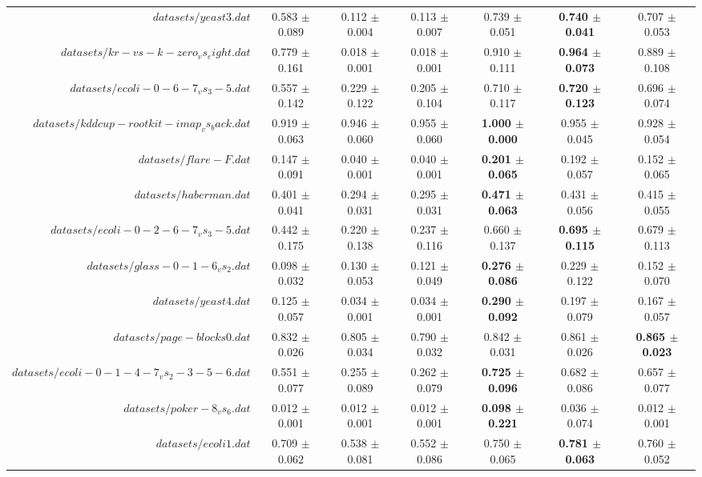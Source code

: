 \begin{table}[!ht]
{\begin{tabular}{r c c c c c c}
$datasets/yeast3.dat$ & 0.583 $\pm$ 0.089 & 0.112 $\pm$ 0.004 & 0.113 $\pm$ 0.007 & 0.739 $\pm$ 0.051 & \textbf{0.740 $\pm$ 0.041} & 0.707 $\pm$ 0.053 \\
$datasets/kr-vs-k-zero_vs_eight.dat$ & 0.779 $\pm$ 0.161 & 0.018 $\pm$ 0.001 & 0.018 $\pm$ 0.001 & 0.910 $\pm$ 0.111 & \textbf{0.964 $\pm$ 0.073} & 0.889 $\pm$ 0.108 \\
$datasets/ecoli-0-6-7_vs_3-5.dat$ & 0.557 $\pm$ 0.142 & 0.229 $\pm$ 0.122 & 0.205 $\pm$ 0.104 & 0.710 $\pm$ 0.117 & \textbf{0.720 $\pm$ 0.123} & 0.696 $\pm$ 0.074 \\
$datasets/kddcup-rootkit-imap_vs_back.dat$ & 0.919 $\pm$ 0.063 & 0.946 $\pm$ 0.060 & 0.955 $\pm$ 0.060 & \textbf{1.000 $\pm$ 0.000} & 0.955 $\pm$ 0.045 & 0.928 $\pm$ 0.054 \\
$datasets/flare-F.dat$ & 0.147 $\pm$ 0.091 & 0.040 $\pm$ 0.001 & 0.040 $\pm$ 0.001 & \textbf{0.201 $\pm$ 0.065} & 0.192 $\pm$ 0.057 & 0.152 $\pm$ 0.065 \\
$datasets/haberman.dat$ & 0.401 $\pm$ 0.041 & 0.294 $\pm$ 0.031 & 0.295 $\pm$ 0.031 & \textbf{0.471 $\pm$ 0.063} & 0.431 $\pm$ 0.056 & 0.415 $\pm$ 0.055 \\
$datasets/ecoli-0-2-6-7_vs_3-5.dat$ & 0.442 $\pm$ 0.175 & 0.220 $\pm$ 0.138 & 0.237 $\pm$ 0.116 & 0.660 $\pm$ 0.137 & \textbf{0.695 $\pm$ 0.115} & 0.679 $\pm$ 0.113 \\
$datasets/glass-0-1-6_vs_2.dat$ & 0.098 $\pm$ 0.032 & 0.130 $\pm$ 0.053 & 0.121 $\pm$ 0.049 & \textbf{0.276 $\pm$ 0.086} & 0.229 $\pm$ 0.122 & 0.152 $\pm$ 0.070 \\
$datasets/yeast4.dat$ & 0.125 $\pm$ 0.057 & 0.034 $\pm$ 0.001 & 0.034 $\pm$ 0.001 & \textbf{0.290 $\pm$ 0.092} & 0.197 $\pm$ 0.079 & 0.167 $\pm$ 0.057 \\
$datasets/page-blocks0.dat$ & 0.832 $\pm$ 0.026 & 0.805 $\pm$ 0.034 & 0.790 $\pm$ 0.032 & 0.842 $\pm$ 0.031 & 0.861 $\pm$ 0.026 & \textbf{0.865 $\pm$ 0.023} \\
$datasets/ecoli-0-1-4-7_vs_2-3-5-6.dat$ & 0.551 $\pm$ 0.077 & 0.255 $\pm$ 0.089 & 0.262 $\pm$ 0.079 & \textbf{0.725 $\pm$ 0.096} & 0.682 $\pm$ 0.086 & 0.657 $\pm$ 0.077 \\
$datasets/poker-8_vs_6.dat$ & 0.012 $\pm$ 0.001 & 0.012 $\pm$ 0.001 & 0.012 $\pm$ 0.001 & \textbf{0.098 $\pm$ 0.221} & 0.036 $\pm$ 0.074 & 0.012 $\pm$ 0.001 \\
$datasets/ecoli1.dat$ & 0.709 $\pm$ 0.062 & 0.538 $\pm$ 0.081 & 0.552 $\pm$ 0.086 & 0.750 $\pm$ 0.065 & \textbf{0.781 $\pm$ 0.063} & 0.760 $\pm$ 0.052 \\

\end{tabular}}
\end{table}
